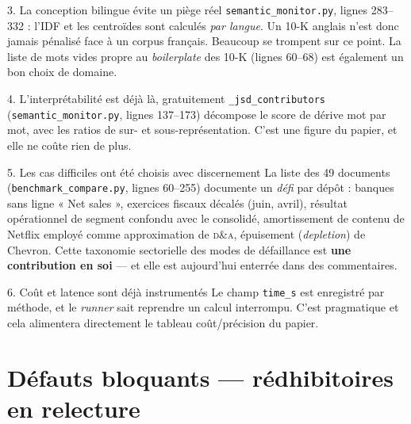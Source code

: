 \documentclass[11pt,a4paper]{article}
\newcommand{\fic}[1]{\texttt{\small #1}}
\begin{document}
\begin{bon}{3. La conception bilingue évite un piège réel}
\fic{semantic\_monitor.py}, lignes 283--332 : l'IDF et les centroïdes sont
calculés \emph{par langue}. Un 10-K anglais n'est donc jamais pénalisé face à un
corpus français. Beaucoup se trompent sur ce point. La liste de mots vides
propre au \textit{boilerplate} des 10-K (lignes 60--68) est également un bon
choix de domaine.
\end{bon}

\begin{bon}{4. L'interprétabilité est déjà là, gratuitement}
\fic{\_jsd\_contributors} (\fic{semantic\_monitor.py}, lignes 137--173) décompose
le score de dérive mot par mot, avec les ratios de sur- et
sous-représentation. C'est une figure du papier, et elle ne coûte rien de plus.
\end{bon}

\begin{bon}{5. Les cas difficiles ont été choisis avec discernement}
La liste des 49 documents (\fic{benchmark\_compare.py}, lignes 60--255) documente
un \emph{défi} par dépôt : banques sans ligne « Net sales », exercices fiscaux
décalés (juin, avril), résultat opérationnel de segment confondu avec le
consolidé, amortissement de contenu de Netflix employé comme approximation de
\textsc{d\&a}, épuisement (\textit{depletion}) de Chevron. Cette taxonomie
sectorielle des modes de défaillance est \textbf{une contribution en soi} --- et
elle est aujourd'hui enterrée dans des commentaires.
\end{bon}

\begin{bon}{6. Coût et latence sont déjà instrumentés}
Le champ \fic{time\_s} est enregistré par méthode, et le \textit{runner} sait
reprendre un calcul interrompu. C'est pragmatique et cela alimentera directement
le tableau coût/précision du papier.
\end{bon}

\section{Défauts bloquants --- rédhibitoires en relecture}
\label{sec:fatal}
\end{document}
